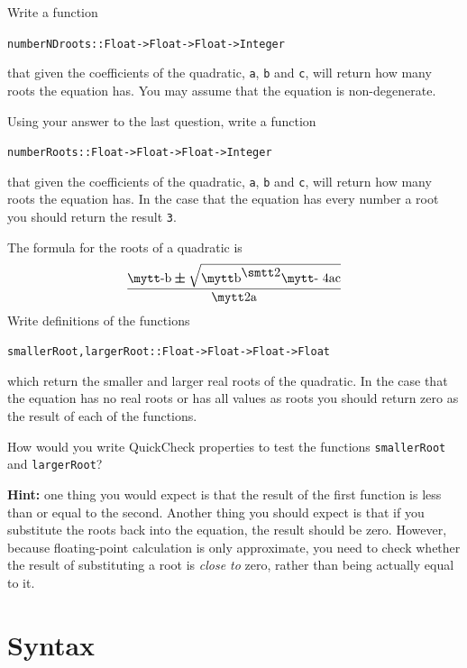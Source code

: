 \begin{exercises}
\item
Write a function
\begin{alltt}
numberNDroots :: Float -> Float -> Float -> Integer 
\end{alltt} 
that given the coefficients of the quadratic,
\texttt{a}, \texttt{b} and \texttt{c}, will return how many roots the
equation has. 
You may assume that the equation is 
non-degenerate.

\item
Using your answer to the last question, write a function 
\begin{alltt}
numberRoots :: Float -> Float -> Float -> Integer 
\end{alltt}
that given 
the coefficients of the quadratic,
\texttt{a}, \texttt{b} and \texttt{c}, will return how many roots the
equation has. In the case that the equation has every number a root you
should return the result \texttt{3}.

\item
The formula for the roots of a quadratic is 
\[
\frac{\mbox{\mi -b}\: \mbox{\boldmath{$\pm$}}\: \sqrt{\superscr{b}{2} \mbox{\mi
- 4ac}}}{\mbox{\mi 2a}}
\]
Write definitions of the functions
\begin{alltt}
smallerRoot, largerRoot :: Float -> Float -> Float -> Float
\end{alltt}
which return the smaller and larger real roots of the quadratic. In the case
that the equation has no real roots or has all values as roots you should return
zero as the result of each of the functions.

\item
How would you write QuickCheck properties to test the functions \texttt{smallerRoot} and \texttt{largerRoot}? 

\medskip
\noindent
\textbf{Hint:} one thing you would expect is that the result of the first function is less than or equal to the second. Another thing you should expect is that if you substitute the roots back into the equation, the result should be zero. However, because floating-point calculation is only approximate, you need to check whether the result of substituting a root is \emph{close to} zero, rather than being actually equal to it.


\end{exercises}


\section{Syntax}
\label{syntax}

